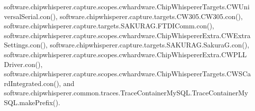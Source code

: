 software.\+chipwhisperer.\+capture.\+scopes.\+cwhardware.\+Chip\+Whisperer\+Targets.\+C\+W\+Universal\+Serial.\+con(), software.\+chipwhisperer.\+capture.\+targets.\+C\+W305.\+C\+W305.\+con(), software.\+chipwhisperer.\+capture.\+targets.\+S\+A\+K\+U\+R\+A\+G.\+F\+T\+D\+I\+Comm.\+con(), software.\+chipwhisperer.\+capture.\+scopes.\+cwhardware.\+Chip\+Whisperer\+Extra.\+C\+W\+Extra\+Settings.\+con(), software.\+chipwhisperer.\+capture.\+targets.\+S\+A\+K\+U\+R\+A\+G.\+Sakura\+G.\+con(), software.\+chipwhisperer.\+capture.\+scopes.\+cwhardware.\+Chip\+Whisperer\+Extra.\+C\+W\+P\+L\+L\+Driver.\+con(), software.\+chipwhisperer.\+capture.\+scopes.\+cwhardware.\+Chip\+Whisperer\+Targets.\+C\+W\+S\+Card\+Integrated.\+con(), and software.\+chipwhisperer.\+common.\+traces.\+Trace\+Container\+My\+S\+Q\+L.\+Trace\+Container\+My\+S\+Q\+L.\+make\+Prefix().


